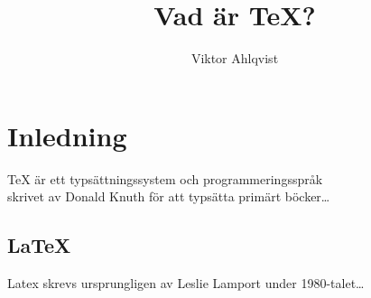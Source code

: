 \documentclass[10pt]{article}
\begin{document}
	\author{Viktor Ahlqvist}
	\title{Vad är TeX? }
	\maketitle
	\section{Inledning}
	TeX är ett typsättningssystem och programmeringsspråk\\
	skrivet av Donald Knuth för att
	typsätta primärt böcker\ldots
	\subsection{LaTeX}
	Latex skrevs ursprungligen av Leslie Lamport under 1980-talet\ldots
\end{document}
